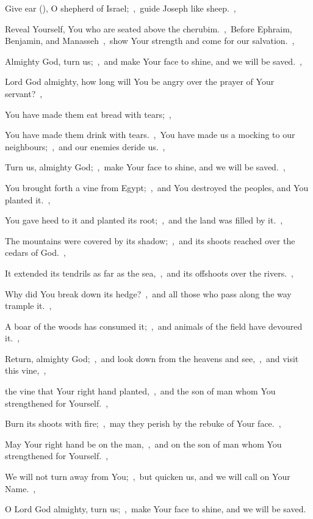 \documentclass[12pt,twoside,a5paper]{article}
\begin{document}

\begin{normalparskip}
  Give ear (), O shepherd of Israel;~\sep\ guide Joseph like sheep.~\sep


  Reveal Yourself, You who are seated above the cherubim.~\sep\ Before Ephraim, Benjamin, and Manasseh~\sep\ show Your strength and come for our salvation.~\sep

  Almighty God, turn us;~\sep\ and make Your face to shine, and we will be saved.~\sep

  Lord God almighty, how long will You be angry over the prayer of Your servant?~\sep

  You have made them eat bread with tears;~\sep

  You have made them drink with tears.~\sep\ You have made us a mocking to our neighbours;~\sep\ and our enemies deride us.~\sep

  Turn us, almighty God;~\sep\ make Your face to shine, and we will be saved.~\sep

  You brought forth a vine from Egypt;~\sep\ and You destroyed the peoples, and You planted it.~\sep

  You gave heed to it and planted its root;~\sep\ and the land was filled by it.~\sep

  The mountains were covered by its shadow;~\sep\ and its shoots reached over the cedars of God.~\sep

  It extended its tendrils as far as the sea,~\sep\ and its offshoots over the rivers.~\sep

  Why did You break down its hedge?~\sep\ and all those who pass along the way trample it.~\sep

  A boar of the woods has consumed it;~\sep\ and animals of the field have devoured it.~\sep

  Return, almighty God;~\sep\ and look down from the heavens and see,~\sep\ and visit this vine,~\sep

  the vine that Your right hand planted,~\sep\ and the son of man whom You strengthened for Yourself.~\sep

  Burn its shoots with fire;~\sep\ may they perish by the rebuke of Your face.~\sep

  May Your right hand be on the man,~\sep\ and on the son of man whom You strengthened for Yourself.~\sep

  We will not turn away from You;~\sep\ but quicken us, and we will call on Your Name.~\sep

  O Lord God almighty, turn us;~\sep\ make Your face to shine, and we will be saved.
\end{normalparskip}
\end{document}
